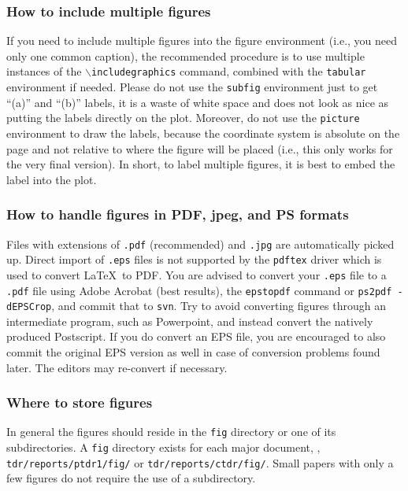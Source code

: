 \subsubsection{How to include multiple figures}

If you need to include multiple figures into the figure environment
(i.e., you need only one common caption), the recommended procedure is to
use multiple instances of the \texttt{$\backslash$includegraphics} command, combined
with the \texttt{tabular} environment if needed. Please do not use the
\texttt{subfig} environment just to get ``(a)'' and ``(b)'' labels, it
is a waste of white space and does not look as nice as putting the
labels directly on the plot. Moreover, do not use the \texttt{picture}
environment to draw the labels, because the coordinate system is
absolute on the page and not relative to where the figure will be
placed (i.e., this only works for the very final version). In short, to
label multiple figures, it is best to embed the label into the plot.



\subsubsection{How to handle figures in PDF, jpeg, and PS formats}

Files with extensions of \texttt{.pdf} (recommended) and \texttt{.jpg}
are automatically picked up.
Direct import of \texttt{.eps} files is not
supported by the \texttt{pdftex} driver which is used to convert
\LaTeX\ to PDF.
You are advised to convert your \texttt{.eps} file to a \texttt{.pdf} file
using Adobe Acrobat (best results), the \texttt{epstopdf}
command or \texttt{ps2pdf -dEPSCrop}, and commit that to \texttt{svn}.
Try to avoid converting figures through an intermediate program, such
as Powerpoint, and instead convert the natively produced
Postscript. If you do convert an EPS file, you are encouraged to also
commit the original EPS version as well in case of conversion
problems found later. The editors may re-convert if necessary.


\subsubsection{Where to store figures}

In general the figures should reside in the \texttt{fig} directory or one
of its subdirectories.
A \texttt{fig} directory exists for each major document, \eg,
\texttt{tdr/reports/ptdr1/fig/} or \linebreak[3]\texttt{tdr/reports/ctdr/fig/}. Small papers with only a few figures do not
require the use of a subdirectory.


